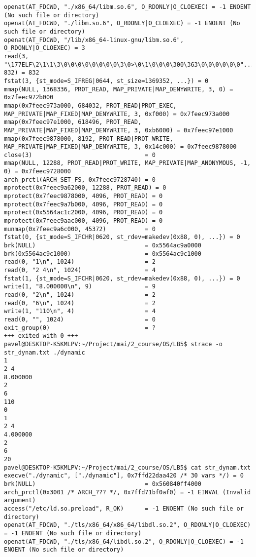 \documentclass[pdf, unicode, 12pt, a4paper,oneside,fleqn]{article}
\begin{document}
{\begin{verbatim}
openat(AT_FDCWD, "./x86_64/libm.so.6", O_RDONLY|O_CLOEXEC) = -1 ENOENT (No such file or directory)
openat(AT_FDCWD, "./libm.so.6", O_RDONLY|O_CLOEXEC) = -1 ENOENT (No such file or directory)
openat(AT_FDCWD, "/lib/x86_64-linux-gnu/libm.so.6", O_RDONLY|O_CLOEXEC) = 3
read(3, "\177ELF\2\1\1\3\0\0\0\0\0\0\0\0\3\0>\0\1\0\0\0\300\363\0\0\0\0\0\0"..., 832) = 832
fstat(3, {st_mode=S_IFREG|0644, st_size=1369352, ...}) = 0
mmap(NULL, 1368336, PROT_READ, MAP_PRIVATE|MAP_DENYWRITE, 3, 0) = 0x7feec972b000
mmap(0x7feec973a000, 684032, PROT_READ|PROT_EXEC, MAP_PRIVATE|MAP_FIXED|MAP_DENYWRITE, 3, 0xf000) = 0x7feec973a000
mmap(0x7feec97e1000, 618496, PROT_READ, MAP_PRIVATE|MAP_FIXED|MAP_DENYWRITE, 3, 0xb6000) = 0x7feec97e1000
mmap(0x7feec9878000, 8192, PROT_READ|PROT_WRITE, MAP_PRIVATE|MAP_FIXED|MAP_DENYWRITE, 3, 0x14c000) = 0x7feec9878000
close(3)                                = 0
mmap(NULL, 12288, PROT_READ|PROT_WRITE, MAP_PRIVATE|MAP_ANONYMOUS, -1, 0) = 0x7feec9728000
arch_prctl(ARCH_SET_FS, 0x7feec9728740) = 0
mprotect(0x7feec9a62000, 12288, PROT_READ) = 0
mprotect(0x7feec9878000, 4096, PROT_READ) = 0
mprotect(0x7feec9a7b000, 4096, PROT_READ) = 0
mprotect(0x5564ac1c2000, 4096, PROT_READ) = 0
mprotect(0x7feec9aac000, 4096, PROT_READ) = 0
munmap(0x7feec9a6c000, 45372)           = 0
fstat(0, {st_mode=S_IFCHR|0620, st_rdev=makedev(0x88, 0), ...}) = 0
brk(NULL)                               = 0x5564ac9a0000
brk(0x5564ac9c1000)                     = 0x5564ac9c1000
read(0, "1\n", 1024)                    = 2
read(0, "2 4\n", 1024)                  = 4
fstat(1, {st_mode=S_IFCHR|0620, st_rdev=makedev(0x88, 0), ...}) = 0
write(1, "8.000000\n", 9)               = 9
read(0, "2\n", 1024)                    = 2
read(0, "6\n", 1024)                    = 2
write(1, "110\n", 4)                    = 4
read(0, "", 1024)                       = 0
exit_group(0)                           = ?
+++ exited with 0 +++
pavel@DESKTOP-K5KMLPV:~/Project/mai/2_course/OS/LB5$ strace -o str_dynam.txt ./dynamic
1
2 4
8.000000
2
6
110
0
1
2 4
4.000000
2
6
20
pavel@DESKTOP-K5KMLPV:~/Project/mai/2_course/OS/LB5$ cat str_dynam.txt
execve("./dynamic", ["./dynamic"], 0x7ffd22daa420 /* 30 vars */) = 0
brk(NULL)                               = 0x560840ff4000
arch_prctl(0x3001 /* ARCH_??? */, 0x7ffd71bf0af0) = -1 EINVAL (Invalid argument)
access("/etc/ld.so.preload", R_OK)      = -1 ENOENT (No such file or directory)
openat(AT_FDCWD, "./tls/x86_64/x86_64/libdl.so.2", O_RDONLY|O_CLOEXEC) = -1 ENOENT (No such file or directory)
openat(AT_FDCWD, "./tls/x86_64/libdl.so.2", O_RDONLY|O_CLOEXEC) = -1 ENOENT (No such file or directory)

\end{verbatim}}
\end{document}
